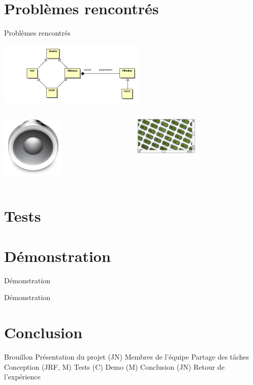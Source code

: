 \documentclass[frenchb]{beamer}
\begin{document}
\section{Problèmes rencontrés}

\begin{frame}{Problèmes rencontrés}
    \begin{center}
        \includegraphics[width=7cm]{../img/ps/pacmodule-psm.pdf}
    \end{center}
    \pause
    \begin{columns}
        \begin{column}[l]{7cm}
        \includegraphics[width=3cm]{../img/png/arts128x128.png}
        \end{column}
        \pause
        \begin{column}[r]{4cm}
        \includegraphics[width=3cm]{../img/png/graphicsview-view.png}
        \end{column}
    \end{columns}
\end{frame}

\section{Tests}

\section{Démonstration}

\begin{frame}{Démonstration}
    \begin{center}
        Démonstration
    \end{center}
\end{frame}

\section{Conclusion}

\begin{frame}{Brouillon}
Présentation du projet (JN)
Membres de l'équipe
Partage des tâches
Conception (JRF, M)
Tests (C)
Demo (M)
Conclusion (JN)
Retour de l'expérience
\end{frame}
\end{document}
